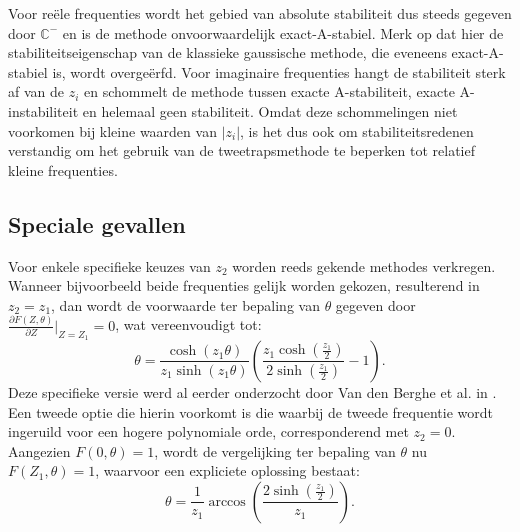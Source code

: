 \documentclass[12pt]{article}
\begin{document}
Voor reële frequenties wordt het gebied van absolute stabiliteit dus steeds gegeven door \(\mathbb{C}^-\) en is de methode onvoorwaardelijk exact-A-stabiel. Merk op dat hier de stabiliteitseigenschap van de klassieke gaussische methode, die eveneens exact-A-stabiel is, wordt overgeërfd. Voor imaginaire frequenties hangt de stabiliteit sterk af van de \(z_i\) en schommelt de methode tussen exacte A-stabiliteit, exacte A-instabiliteit en helemaal geen stabiliteit. Omdat deze schommelingen niet voorkomen bij kleine waarden van \(|z_i|\), is het dus ook om stabiliteitsredenen verstandig om het gebruik van de tweetrapsmethode te beperken tot relatief kleine frequenties.

\subsection{Speciale gevallen}
Voor enkele specifieke keuzes van \(z_2\) worden reeds gekende methodes verkregen. Wanneer bijvoorbeeld beide frequenties gelijk worden gekozen, resulterend in \(z_2=z_1\), dan wordt de voorwaarde ter bepaling van \(\theta\) gegeven door \(\frac{\partial F(Z,\theta)}{\partial Z}\bigr|_{Z=Z_1}=0\), wat vereenvoudigt tot:
\begin{equation} \label{eq:rks2z2=z1}
    \theta=\frac{\cosh(z_1\theta)}{z_1\sinh(z_1\theta)}\left(\frac{z_1\cosh(\frac{z_1}{2})}{2\sinh(\frac{z_1}{2})}-1\right).
\end{equation}
Deze specifieke versie werd al eerder onderzocht door Van den Berghe et al. in \cite{EFRKrevisited}. Een tweede optie die hierin voorkomt is die waarbij de tweede frequentie wordt ingeruild voor een hogere polynomiale orde, corresponderend met \(z_2=0\). Aangezien \(F(0,\theta)=1\), wordt de vergelijking ter bepaling van \(\theta\) nu \(F(Z_1,\theta)=1\), waarvoor een expliciete oplossing bestaat:
\begin{equation} \label{eq:rks2z2=0}
    \theta=\frac{1}{z_1}\arccos\left(\frac{2\sinh(\frac{z_1}{2})}{z_1}\right).
\end{equation}
\end{document}
